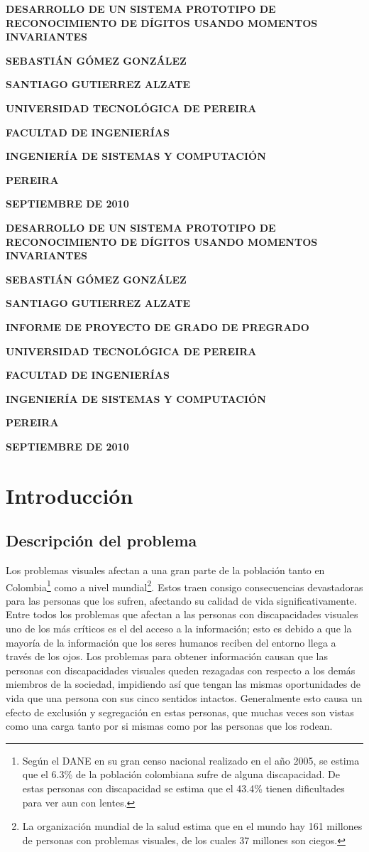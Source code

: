 \documentclass[a4paper, 11pt, oneside]{report}
\newcommand\portada{
	\begin{titlepage}
		\begin{center}
			{\large \bf DESARROLLO DE UN SISTEMA PROTOTIPO DE RECONOCIMIENTO DE DÍGITOS USANDO MOMENTOS INVARIANTES }
			\vfill
			{\large\bf SEBASTIÁN GÓMEZ GONZÁLEZ \par}
			{\large\bf SANTIAGO GUTIERREZ ALZATE \par}
			\vfill
			{\large\bf UNIVERSIDAD TECNOLÓGICA DE PEREIRA  \par}
			{\large\bf FACULTAD DE INGENIERÍAS \par}
			{\large\bf INGENIERÍA DE SISTEMAS Y COMPUTACIÓN \par}
			{\large\bf PEREIRA\par}
			{\large\bf SEPTIEMBRE DE 2010 \par}
		\end{center}
	\end{titlepage}
}
\newcommand\contraportada{
	\begin{titlepage}
		\begin{center}
			{\large \bf DESARROLLO DE UN SISTEMA PROTOTIPO DE RECONOCIMIENTO DE DÍGITOS USANDO MOMENTOS INVARIANTES }
			\vfill
			{\large\bf SEBASTIÁN GÓMEZ GONZÁLEZ \par}
			{\large\bf SANTIAGO GUTIERREZ ALZATE \par}
			\vfill
			{\large\bf INFORME DE PROYECTO DE GRADO DE PREGRADO\par}
			\vfill
			{\large\bf UNIVERSIDAD TECNOLÓGICA DE PEREIRA  \par}
			{\large\bf FACULTAD DE INGENIERÍAS \par}
			{\large\bf INGENIERÍA DE SISTEMAS Y COMPUTACIÓN \par}
			{\large\bf PEREIRA\par}
			{\large\bf SEPTIEMBRE DE 2010 \par}
		\end{center}
	\end{titlepage}
}
\begin{document}
\portada

\contraportada

\tableofcontents

\listoffigures

\listoftables

\chapter{Introducción}
\label{chap:intro}

\section{Descripción del problema}

Los problemas visuales afectan a una gran parte de la población tanto en Colombia\footnote{Según el DANE en su gran censo nacional realizado en el año 2005, se estima que el 6.3\% de la población colombiana sufre de alguna discapacidad. De estas personas con discapacidad se estima que el 43.4\% tienen dificultades para ver aun con lentes.} como a nivel mundial\footnote{La organización mundial de la salud estima que en el mundo hay 161 millones de personas con problemas visuales, de los cuales 37 millones son ciegos.}. Estos traen consigo consecuencias devastadoras para las personas que los sufren, afectando su calidad de vida significativamente. Entre todos los problemas que afectan a las personas con discapacidades visuales uno de los más críticos es el del acceso a la información; esto es debido a que la mayoría de la información que los seres humanos reciben del entorno llega a través de los ojos. Los problemas para obtener información causan que las personas con discapacidades visuales queden rezagadas con respecto a los demás miembros de la sociedad, impidiendo así que tengan las mismas oportunidades de vida que una persona con sus cinco sentidos intactos. Generalmente esto causa un efecto de exclusión y segregación en estas personas, que muchas veces son vistas como una carga tanto por si mismas como por las personas que los rodean. 
\end{document}

